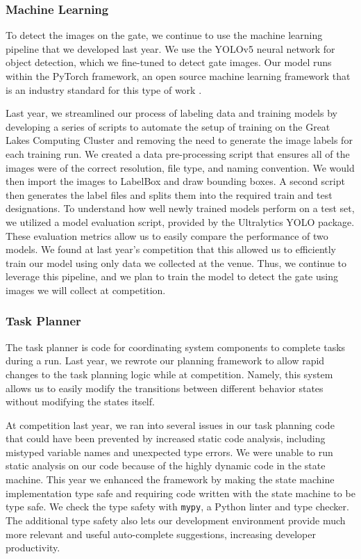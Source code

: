 \documentclass[conference]{IEEEtran}
\begin{document}

\subsubsection{Machine Learning}
\label{sssec:ml_flow}
To detect the images on the gate, we continue to use the machine learning pipeline that we developed last year. We use the YOLOv5 neural network \cite{b3} for object detection, which we fine-tuned to detect gate images. Our model runs within the PyTorch framework, an open source machine learning framework that is an industry standard for this type of work \cite{b4}. 

Last year, we streamlined our process of labeling data and training models by developing a series of scripts to automate the setup of training on the Great Lakes Computing Cluster and removing the need to generate the image labels for each training run. We created a data pre-processing script that ensures all of the images were of the correct resolution, file type, and naming convention. We would then import the images to LabelBox and draw bounding boxes. A second script then generates the label files and splits them into the required train and test designations. To understand how well newly trained models perform on a test set, we utilized a model evaluation script, provided by the Ultralytics YOLO package. These evaluation metrics allow us to easily compare the performance of two models. We found at last year’s competition that this allowed us to efficiently train our model using only data we collected at the venue. Thus, we continue to leverage this pipeline, and we plan to train the model to detect the gate using images we will collect at competition.

\subsubsection{Task Planner}
\label{sssec:task_planner}
The task planner is code for coordinating system components to complete tasks during a run. Last year, we rewrote our planning framework to allow rapid changes to the task planning logic while at competition. Namely, this system allows us to easily modify the transitions between different behavior states without modifying the states itself.

At competition last year, we ran into several issues in our task planning code that could have been prevented by increased static code analysis, including mistyped variable names and unexpected type errors. We were unable to run static analysis on our code because of the highly dynamic code in the state machine. This year we enhanced the framework by making the state machine implementation type safe and requiring code written with the state machine to be type safe. We check the type safety with \verb|mypy|, a Python linter and type checker. The additional type safety also lets our development environment provide much more relevant and useful auto-complete suggestions, increasing developer productivity.
\end{document}
